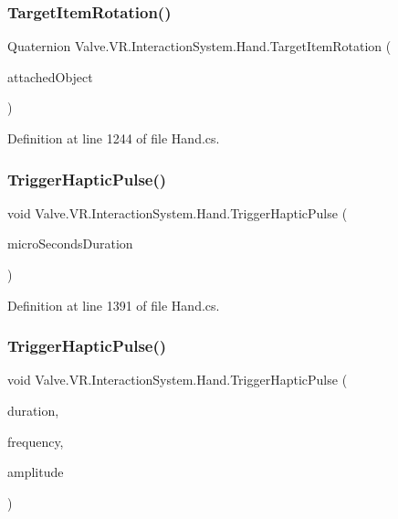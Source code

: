 \subsubsection{\texorpdfstring{TargetItemRotation()}{TargetItemRotation()}}
{\footnotesize\ttfamily Quaternion Valve.\+V\+R.\+Interaction\+System.\+Hand.\+Target\+Item\+Rotation (\begin{DoxyParamCaption}\item[{\mbox{\hyperlink{struct_valve_1_1_v_r_1_1_interaction_system_1_1_hand_1_1_attached_object}{Attached\+Object}}}]{attached\+Object }\end{DoxyParamCaption})\hspace{0.3cm}{\ttfamily [protected]}}



Definition at line 1244 of file Hand.\+cs.

\mbox{\label{class_valve_1_1_v_r_1_1_interaction_system_1_1_hand_ab9e8c722bbad5cb37f0268f4c1745118}} 
\subsubsection{\texorpdfstring{TriggerHapticPulse()}{TriggerHapticPulse()}\hspace{0.1cm}{\footnotesize\ttfamily [1/2]}}
{\footnotesize\ttfamily void Valve.\+V\+R.\+Interaction\+System.\+Hand.\+Trigger\+Haptic\+Pulse (\begin{DoxyParamCaption}\item[{ushort}]{micro\+Seconds\+Duration }\end{DoxyParamCaption})}



Definition at line 1391 of file Hand.\+cs.

\mbox{\label{class_valve_1_1_v_r_1_1_interaction_system_1_1_hand_a84aea2a4f260ef66494bd28ab0d8a590}} 
\subsubsection{\texorpdfstring{TriggerHapticPulse()}{TriggerHapticPulse()}\hspace{0.1cm}{\footnotesize\ttfamily [2/2]}}
{\footnotesize\ttfamily void Valve.\+V\+R.\+Interaction\+System.\+Hand.\+Trigger\+Haptic\+Pulse (\begin{DoxyParamCaption}\item[{float}]{duration,  }\item[{float}]{frequency,  }\item[{float}]{amplitude }\end{DoxyParamCaption})}



